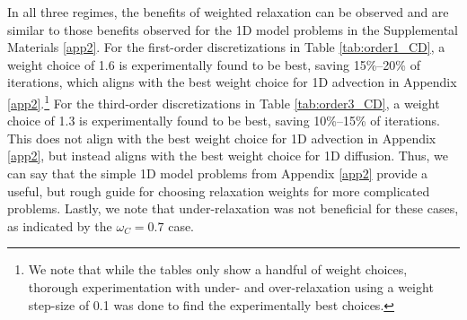 \documentclass[VANCOUVER,STIX1COL]{WileyNJD-v2}
\begin{document}
In all three regimes, the benefits of weighted relaxation can be observed and
are similar to those benefits observed for the 1D model problems in the Supplemental 
Materials \ref{app2}. 
For the first-order discretizations in Table 
\ref{tab:order1_CD}, a weight choice of 1.6 is experimentally found to be best, saving
15\%--20\% of iterations, which aligns with the best weight choice for 1D advection in 
Appendix \ref{app2}.\footnote{We note that while the tables only show
a handful of weight choices, thorough experimentation with under- and over-relaxation using a weight step-size of 0.1 was done to find the experimentally best 
choices.  } For the third-order discretizations in Table \ref{tab:order3_CD}, a weight choice 
of 1.3 is  experimentally found to be best, saving 10\%--15\% of iterations.  This does not 
align with  the best weight choice for 1D advection in Appendix \ref{app2}, but instead  
aligns with the best weight choice for 1D diffusion.  Thus, we can say that the simple 1D 
model problems from Appendix \ref{app2} provide a useful, but rough guide for choosing 
relaxation weights for more complicated problems.  Lastly, we note that under-relaxation was 
not beneficial for these cases, as indicated by the $\omega_C = 0.7$ case.
\end{document}
